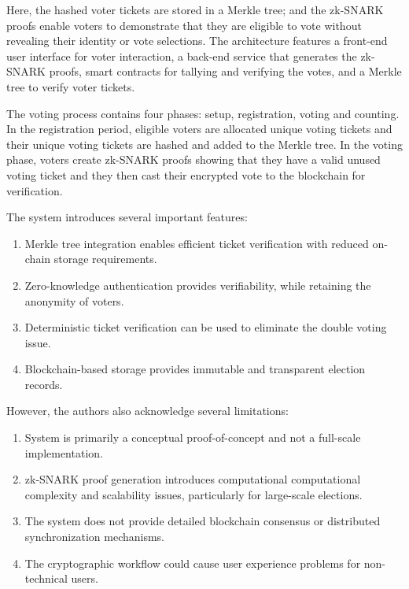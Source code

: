 \documentclass[12pt, a4paper]{report}
\begin{document}
Here, the hashed voter tickets are stored in a Merkle tree; and the zk-SNARK proofs enable voters to demonstrate that they are eligible to vote without revealing their identity or vote selections. The architecture features a front-end user interface for voter interaction, a back-end service that generates the zk-SNARK proofs, smart contracts for tallying and verifying the votes, and a Merkle tree to verify voter tickets.

The voting process contains four phases: setup, registration, voting and counting. In the registration period, eligible voters are allocated unique voting tickets and their unique voting tickets are hashed and added to the Merkle tree. In the voting phase, voters create zk-SNARK proofs showing that they have a valid unused voting ticket and they then cast their encrypted vote to the blockchain for verification.

The system introduces several important features:

\begin{enumerate}
    \item Merkle tree integration enables efficient ticket verification with reduced on-chain storage requirements.
    
    \item Zero-knowledge authentication provides verifiability, while retaining the anonymity of voters.
    
    \item Deterministic ticket verification can be used to eliminate the double voting issue.
    
    \item Blockchain-based storage provides immutable and transparent election records.
\end{enumerate}

However, the authors also acknowledge several limitations:

\begin{enumerate}
    \item System is primarily a conceptual proof-of-concept and not a full-scale implementation.
    
    \item zk-SNARK proof generation introduces computational computational complexity and scalability issues, particularly for large-scale elections.
    
    \item The system does not provide detailed blockchain consensus or distributed synchronization mechanisms.
    
    \item The cryptographic workflow could cause user experience problems for non-technical users.

\end{enumerate}
\end{document}
